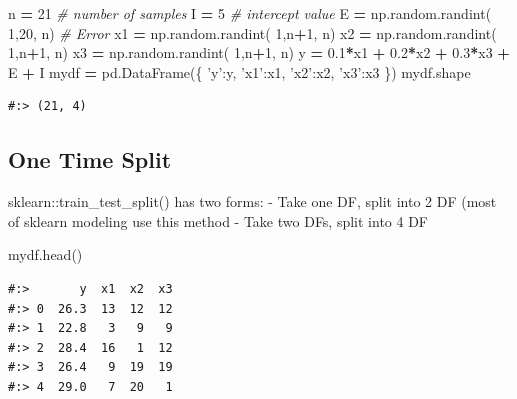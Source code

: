 \documentclass[
]{book}
\newenvironment{Shaded}{\begin{snugshade}}{\end{snugshade}}
\newcommand{\CommentTok}[1]{\textcolor[rgb]{0.37,0.37,0.37}{\textit{#1}}}
\newcommand{\DecValTok}[1]{\textcolor[rgb]{0.06,0.06,0.06}{#1}}
\newcommand{\FloatTok}[1]{\textcolor[rgb]{0.06,0.06,0.06}{#1}}
\newcommand{\NormalTok}[1]{#1}
\newcommand{\OperatorTok}[1]{\textcolor[rgb]{0.43,0.43,0.43}{\textbf{#1}}}
\newcommand{\StringTok}[1]{\textcolor[rgb]{0.5,0.5,0.5}{#1}}
\begin{document}
\begin{Shaded}
\begin{Highlighting}[]
\NormalTok{n }\OperatorTok{=} \DecValTok{21}  \CommentTok{# number of samples}
\NormalTok{I }\OperatorTok{=} \DecValTok{5}  \CommentTok{# intercept value}
\NormalTok{E }\OperatorTok{=}\NormalTok{ np.random.randint( }\DecValTok{1}\NormalTok{,}\DecValTok{20}\NormalTok{, n)  }\CommentTok{# Error}
\NormalTok{x1 }\OperatorTok{=}\NormalTok{ np.random.randint( }\DecValTok{1}\NormalTok{,n}\OperatorTok{+}\DecValTok{1}\NormalTok{, n)}
\NormalTok{x2 }\OperatorTok{=}\NormalTok{ np.random.randint( }\DecValTok{1}\NormalTok{,n}\OperatorTok{+}\DecValTok{1}\NormalTok{, n)}
\NormalTok{x3 }\OperatorTok{=}\NormalTok{ np.random.randint( }\DecValTok{1}\NormalTok{,n}\OperatorTok{+}\DecValTok{1}\NormalTok{, n)}
\NormalTok{y }\OperatorTok{=} \FloatTok{0.1}\OperatorTok{*}\NormalTok{x1 }\OperatorTok{+} \FloatTok{0.2}\OperatorTok{*}\NormalTok{x2 }\OperatorTok{+} \FloatTok{0.3}\OperatorTok{*}\NormalTok{x3 }\OperatorTok{+}\NormalTok{ E }\OperatorTok{+}\NormalTok{ I}
\NormalTok{mydf }\OperatorTok{=}\NormalTok{ pd.DataFrame(\{}
    \StringTok{'y'}\NormalTok{:y,}
    \StringTok{'x1'}\NormalTok{:x1,}
    \StringTok{'x2'}\NormalTok{:x2,}
    \StringTok{'x3'}\NormalTok{:x3}
\NormalTok{\})}
\NormalTok{mydf.shape}
\end{Highlighting}
\end{Shaded}

\begin{verbatim}
#:> (21, 4)
\end{verbatim}

\hypertarget{one-time-split}{%
\subsection{One Time Split}\label{one-time-split}}

sklearn::train\_test\_split() has two forms: - Take one DF, split into 2 DF (most of sklearn modeling use this method - Take two DFs, split into 4 DF

\begin{Shaded}
\begin{Highlighting}[]
\NormalTok{mydf.head()}
\end{Highlighting}
\end{Shaded}

\begin{verbatim}
#:>       y  x1  x2  x3
#:> 0  26.3  13  12  12
#:> 1  22.8   3   9   9
#:> 2  28.4  16   1  12
#:> 3  26.4   9  19  19
#:> 4  29.0   7  20   1
\end{verbatim}
\end{document}
